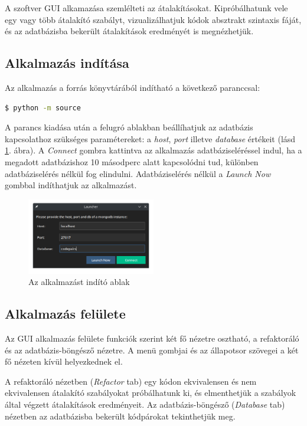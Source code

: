 A szoftver GUI alkamazása szemlélteti az átalakításokat.
Kipróbálhatunk vele egy vagy több átalakító szabályt,
vizualizálhatjuk kódok absztrakt szintaxis fáját,
és az adatbázisba bekerült átalakítások eredményét is megnézhetjük.

\subsection{Alkalmazás indítása}

Az alkalmazás a forrás könyvtárából indítható a következő paranccsal:

\begin{lstlisting}[language=bash, numbers=none]
	$ python -m source
\end{lstlisting}

A parancs kiadása után a felugró ablakban beállíhatjuk az adatbázis kapcsolathoz szükséges paramétereket:
a \emph{host}, \emph{port} illetve \emph{database} értékeit (lásd \ref{fig:launcher}. ábra).
A \emph{Connect} gombra kattintva az alkalmazás adatbáziseléréssel indul,
ha a megadott adatbázishoz 10 másodperc alatt kapcsolódni tud,
különben adatbáziselérés nélkül fog elindulni.
Adatbáziselérés nélkül a \emph{Launch Now} gombbal indíthatjuk az alkalmazást.

\begin{figure}[H]
	\centering
	\includegraphics[width=0.5\textwidth]{images/screenshots/launcher.png}
	\caption{\label{fig:launcher}Az alkalmazást indító ablak}
\end{figure}

\subsection{Alkalmazás felülete}

Az GUI alkalmazás felülete funkciók szerint két fő nézetre osztható, a refaktoráló és az adatbázis-böngésző nézetre.
A menü gombjai és az állapotsor szövegei a két fő nézeten kívül helyezkednek el.

A refaktoráló nézetben (\emph{Refactor} tab) egy kódon
ekvivalensen és nem ekvivalensen átalakító szabályokat próbálhatunk ki, és elmenthetjük
a szabályok által végzett átalakítások eredményeit.
Az adatbázis-böngésző (\emph{Database} tab) nézetben az adatbázisba bekerült kódpárokat tekinthetjük meg.

